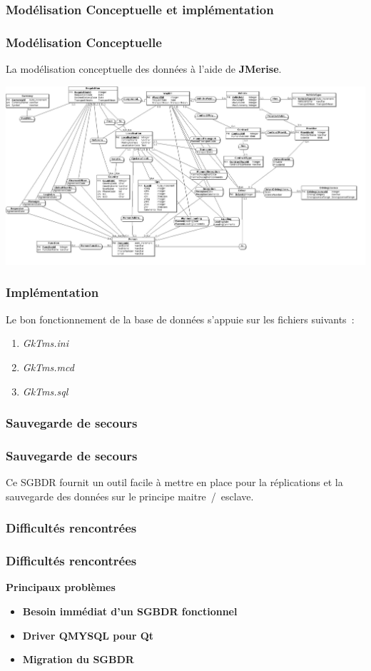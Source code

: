 \subsubsection[Modélisation Conceptuelle et implémentation]{Modélisation Conceptuelle et implémentation}
\begin{frame}
\frametitle{Modélisation Conceptuelle}
La modélisation conceptuelle des données à l'aide de \textbf{JMerise}.\\
\begin{center}
\includegraphics[scale=0.15]{Images/Database}
\end{center}
\end{frame}

\begin{frame}
\frametitle{Implémentation}
Le bon fonctionnement de la base de données s'appuie sur les fichiers suivants~:
\begin{enumerate}
	\item \emph{GkTms.ini}
	\item \emph{GkTms.mcd}
	\item \emph{GkTms.sql}
\end{enumerate}
\end{frame}

\subsubsection[Sauvegarde de secours]{Sauvegarde de secours}
\begin{frame}
\frametitle{Sauvegarde de secours}
Ce SGBDR fournit un outil facile à mettre en place pour la réplications et la sauvegarde des données sur le principe maitre~/~esclave.
\end{frame}

\subsubsection{Difficultés rencontrées}
\begin{frame}
\frametitle{Difficultés rencontrées}
\begin{block}{\textbf{Principaux problèmes}}
\begin{itemize}
\item \textbf{Besoin immédiat d'un SGBDR fonctionnel}
\item \textbf{Driver QMYSQL pour Qt}
\item \textbf{Migration du SGBDR}
\end{itemize}
\end{block}
\end{frame}
